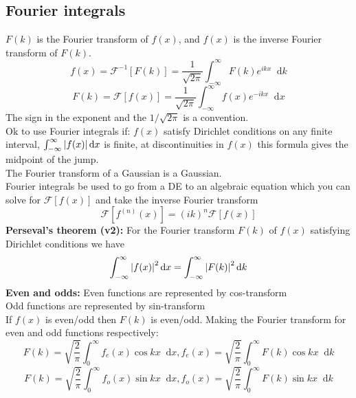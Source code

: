\documentclass[a4paper, 10pt]{article}
\newcommand*\diff{\mathop{}\!\mathrm{d}}
\begin{document}
\begin{multicols*}{3}
\begin{mdframed}
\subsection*{Fourier integrals}
\end{mdframed}
$F(k)$ is the Fourier transform of $f(x)$, and $f(x)$ is the inverse Fourier transform of $F(k)$.
$$ f(x) = \mathcal{F}^{-1}\left[ F(k) \right] = \frac{1}{\sqrt{2\pi}} \int_{-\infty}^{\infty} F(k) e^{ikx} \diff k $$
$$ F(k) = \mathcal{F}\left[ f(x) \right] = \frac{1}{\sqrt{2\pi}} \int_{-\infty}^{\infty} f(x) e^{-ik x} \diff x$$
The sign in the exponent and the $1/\sqrt{2\pi}$ is a convention.\\
Ok to use Fourier integrals if: $f(x)$ satisfy Dirichlet conditions on any finite interval, $\int_{-\infty}^{\infty} \abs{f(x)} \diff x$ is finite, at discontinuities in $f(x)$ this formula gives the midpoint of the jump.\\
The Fourier transform of a Gaussian is a Gaussian.\\
Fourier integrals be used to go from a DE to an algebraic equation which you can solve for $\mathcal{F}\left[ f(x) \right]$ and take the inverse Fourier transform
$$ \mathcal{F}\left[ f^{(n)}(x) \right] = (ik)^n\mathcal{F}\left[ f(x) \right]$$
\textbf{Perseval's theorem (v2):}
For the Fourier transform $F(k)$ of $f(x)$ satisfying Dirichlet conditions we have
$$\int_{-\infty}^{\infty} \abs{f(x)}^2 \diff x = \int_{-\infty}^{\infty} \abs{F(k)}^2 \diff k $$
\textbf{Even and odds:}
Even functions are represented by cos-transform\\
Odd  functions are represented by sin-transform\\
If $f(x)$ is even/odd then $F(k)$ is even/odd. Making the Fourier transform for even and odd functions respectively:
$$F(k) = \sqrt{\frac{2}{\pi}}\int_0^\infty f_e(x) \cos{kx}\diff x, f_e(x) = \sqrt{\frac{2}{\pi}} \int_0^\infty F(k)\cos{kx} \diff k$$
$$F(k) = \sqrt{\frac{2}{\pi}}\int_0^\infty f_o(x) \sin{kx}\diff x, f_o(x) = \sqrt{\frac{2}{\pi}} \int_0^\infty F(k)\sin{kx} \diff k$$

\begin{mdframed}

\end{mdframed}
\end{multicols*}
\end{document}
